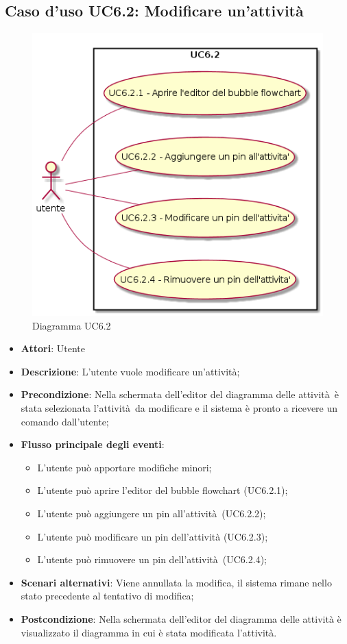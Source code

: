 \documentclass[../AnalisiDeiRequisiti.tex]{subfiles}
\begin{document}
				\subsection{Caso d'uso UC6.2: Modificare un'attività}
				\begin{figure} [H]
					\centering
					\includegraphics[scale=0.45]{./Figures/UC6_2.png}
					\caption{Diagramma UC6.2}\label{}
				\end{figure}
				\begin{itemize}
					\item \textbf{Attori}: Utente
					\item \textbf{Descrizione}: L'utente vuole modificare un'attività;
					\item \textbf{Precondizione}: Nella schermata dell'editor del diagramma delle attività è stata selezionata l'attività da modificare e il sistema è pronto a ricevere un comando dall'utente;
					\item \textbf{Flusso principale degli eventi}: \begin{itemize}
						\item L'utente può apportare modifiche minori;
						\item L'utente può aprire l'editor del bubble flowchart (UC6.2.1);
						\item L'utente può aggiungere un pin all'attività (UC6.2.2);
						\item L'utente può modificare un pin dell'attività (UC6.2.3);
						\item L'utente può rimuovere un pin dell'attività (UC6.2.4);
					\end{itemize}
					\item \textbf{Scenari alternativi}: Viene annullata la modifica, il sistema rimane nello stato precedente al tentativo di modifica;
					\item \textbf{Postcondizione}: Nella schermata dell'editor del diagramma delle attività è visualizzato il diagramma in cui è stata modificata l'attività.
				\end{itemize}
\end{document}
